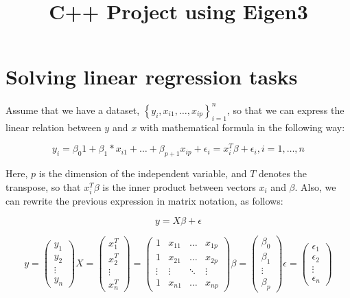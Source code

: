 \documentclass[12pt]{article}
\title{C++ Project using Eigen3}
\begin{document}
    \maketitle
    
\tableofcontents

\section{Solving linear regression tasks}

Assume that we have a dataset, $\left\{y_{i}, x_{i 1}, \ldots, x_{i p}\right\}_{i=1}^{n}$, so that we can express the linear relation between $y$ and $x$ with mathematical formula in the following way:

\begin{equation}
y_{i}=\beta_{0} 1+\beta_{1} * x_{i 1}+\ldots+\beta_{p+1} x_{i p}+\epsilon_{i}=x_{i}^{T} \beta+\epsilon_{i}, i=1, \ldots, n  
\end{equation}

Here, $p$ is the dimension of the independent variable, and $T$ denotes the transpose, so that $x_{i}^{T} \beta$ is the inner product between vectors $x_{i}$ and $\beta$. Also, we can rewrite the previous expression in matrix notation, as follows:

\begin{equation}
y=X \beta+\epsilon
\end{equation}
    

$$
y=\left(\begin{array}{c}
y_{1} \\
y_{2} \\
\vdots \\
y_{n}
\end{array}\right) X=\left(\begin{array}{c}
x_{1}^{T} \\
x_{2}^{T} \\
\vdots \\
x_{n}^{T}
\end{array}\right)=\left(\begin{array}{cccc}
1 & x_{11} & \ldots & x_{1 p} \\
1 & x_{21} & \ldots & x_{2 p} \\
\vdots & \vdots & \ddots & \vdots \\
1 & x_{n 1} & \ldots & x_{n p}
\end{array}\right) \beta=\left(\begin{array}{c}
\beta_{0} \\
\beta_{1} \\
\vdots \\
\beta_{p}
\end{array}\right) \epsilon=\left(\begin{array}{c}
\epsilon_{1} \\
\epsilon_{2} \\
\vdots \\
\epsilon_{n}
\end{array}\right)
$$
\end{document}
